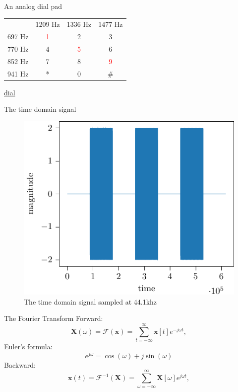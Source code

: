 \documentclass[xcolor=dvipsnames]{beamer}
\begin{document}
\begin{frame}{An analog dial pad}
\centering
\begin{tabular}{c c c c}
      & 1209 Hz & 1336 Hz & 1477 Hz \\
697 Hz   & \textcolor{red}{1}    & 2       & 3    \\  
770 Hz   & 4    & \textcolor{red}{5}       & 6    \\
852 Hz   & 7    & 8       & \textcolor{red}{9}    \\
941 Hz   & *    & 0       & \#     \\
\end{tabular}

\begin{center}
\href{run:./phone_seq.wav}{dial}
\end{center}
\end{frame}


\begin{frame}{The time domain signal}
\centering
\begin{figure}
\includegraphics[width=.6\linewidth]{plots/seq_plot.pdf}
\caption{The time domain signal sampled at 44.1khz}
\end{figure}
\end{frame}

\begin{frame}{The Fourier Transform}
Forward:
\begin{equation}
   \mathbf{X}(\omega) = \mathcal{F}\left(\mathbf{x}\right) = \sum_{t = -\infty}^{\infty} \mathbf{x}[t]e^{-j\omega t},
    \label{eq:STFT}
\end{equation}
Euler's formula:
\begin{equation}
e^{j\omega} = \cos(\omega) + j\sin (\omega)
\end{equation}
Backward:
\begin{equation}
   \mathbf{x}(t) = \mathcal{F}^{-1}\left(\mathbf{X}\right) = \sum_{\omega = -\infty}^{\infty} \mathbf{X}[\omega]e^{j \omega t},
    \label{eq:STFT}
\end{equation}
\end{frame}
\end{document}
